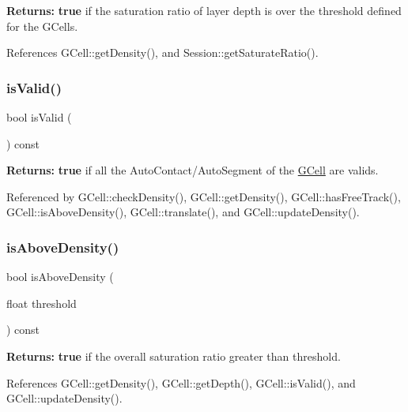{\bfseries Returns\+:} {\bfseries true} if the saturation ratio of layer {\ttfamily depth} is over the threshold defined for the G\+Cells. 

References G\+Cell\+::get\+Density(), and Session\+::get\+Saturate\+Ratio().

\mbox{\label{classKatabatic_1_1GCell_a5bc2a781be2586924afce4e4a4ea6697}} 
\subsubsection{\texorpdfstring{is\+Valid()}{isValid()}}
{\footnotesize\ttfamily bool is\+Valid (\begin{DoxyParamCaption}{ }\end{DoxyParamCaption}) const\hspace{0.3cm}{\ttfamily [inline]}}

{\bfseries Returns\+:} {\bfseries true} if all the Auto\+Contact/\+Auto\+Segment of the \hyperlink{classKatabatic_1_1GCell}{G\+Cell} are valids. 

Referenced by G\+Cell\+::check\+Density(), G\+Cell\+::get\+Density(), G\+Cell\+::has\+Free\+Track(), G\+Cell\+::is\+Above\+Density(), G\+Cell\+::translate(), and G\+Cell\+::update\+Density().

\mbox{\label{classKatabatic_1_1GCell_a0e0a7b382b06e230051965bcb78ed21c}} 
\subsubsection{\texorpdfstring{is\+Above\+Density()}{isAboveDensity()}}
{\footnotesize\ttfamily bool is\+Above\+Density (\begin{DoxyParamCaption}\item[{float}]{threshold }\end{DoxyParamCaption}) const}

{\bfseries Returns\+:} {\bfseries true} if the overall saturation ratio greater than {\ttfamily threshold}. 

References G\+Cell\+::get\+Density(), G\+Cell\+::get\+Depth(), G\+Cell\+::is\+Valid(), and G\+Cell\+::update\+Density().

